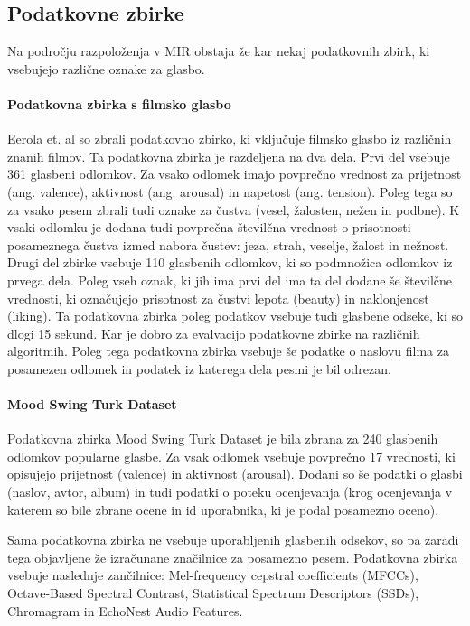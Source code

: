 \documentclass[a4paper, 12pt]{book}
\begin{document}
{\subsection{Podatkovne zbirke}

Na področju razpoloženja v MIR obstaja že kar nekaj podatkovnih zbirk, ki vsebujejo različne oznake za glasbo. 

\paragraph{Podatkovna zbirka s filmsko glasbo}

Eerola et. al \cite{eerola2010comparison} so zbrali podatkovno zbirko, ki vključuje filmsko glasbo iz različnih znanih filmov. Ta podatkovna zbirka je razdeljena na dva dela. Prvi del vsebuje 361 glasbeni odlomkov. Za vsako odlomek imajo povprečno vrednost za prijetnost (ang. valence), aktivnost (ang. arousal) in  napetost (ang. tension). Poleg tega so za vsako pesem zbrali tudi oznake za čustva (vesel, žalosten, nežen in podbne). K vsaki odlomku je dodana tudi povprečna številčna vrednost o prisotnosti posameznega čustva izmed nabora čustev: jeza, strah, veselje, žalost in nežnost. Drugi del zbirke vsebuje 110 glasbenih odlomkov, ki so podmnožica odlomkov iz prvega dela. Poleg vseh oznak, ki jih ima prvi del ima ta del dodane še številčne vrednosti, ki označujejo prisotnost za čustvi lepota (beauty) in naklonjenost (liking). Ta podatkovna zbirka poleg podatkov vsebuje tudi glasbene odseke, ki so dlogi 15 sekund. Kar je dobro za evalvacijo podatkovne zbirke na različnih algoritmih. Poleg tega podatkovna zbirka vsebuje še podatke o naslovu filma za posamezen odlomek in podatek iz katerega dela pesmi je bil odrezan. 

\paragraph{Mood Swing Turk Dataset}

Podatkovna zbirka Mood Swing Turk Dataset \cite{schmidt2011modeling} je bila zbrana za 240 glasbenih odlomkov popularne glasbe. Za vsak odlomek vsebuje povprečno 17 vrednosti, ki opisujejo prijetnost (valence) in aktivnost (arousal). Dodani so še podatki o glasbi (naslov, avtor, album) in tudi podatki o poteku ocenjevanja (krog ocenjevanja v katerem so bile zbrane ocene in id uporabnika, ki je podal posamezno oceno). 

Sama podatkovna zbirka ne vsebuje uporabljenih glasbenih odsekov, so pa zaradi tega objavljene že izračunane značilnice za posamezno pesem. Podatkovna zbirka vsebuje naslednje zančilnice: Mel-frequency cepstral coefficients (MFCCs), Octave-Based Spectral Contrast, Statistical Spectrum Descriptors (SSDs), Chromagram in EchoNest Audio Features.

}
\end{document}
